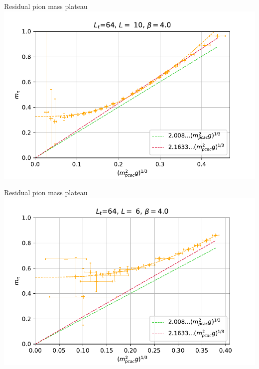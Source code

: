 \documentclass[english]{beamer}
\begin{document}
\begin{frame}{Residual pion mass plateau}
  \includegraphics[width=1\textwidth]{figs/Mpi10x64}
\end{frame}

\begin{frame}{Residual pion mass plateau}
  \includegraphics[width=1\textwidth]{figs/Mpi6x64Pt10}
\end{frame}
\end{document}
